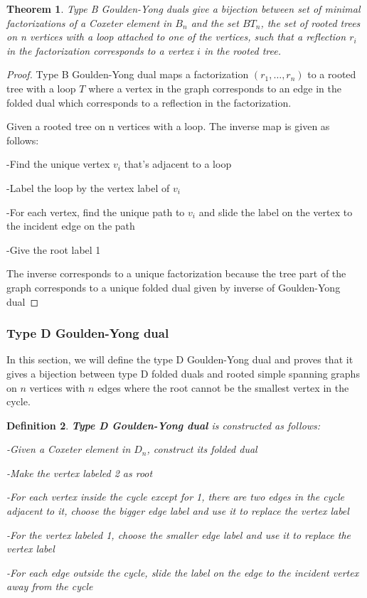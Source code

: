 \documentclass[11pt]{amsart}
\newtheorem{thm}{Theorem}[section]
\newtheorem{defi}[thm]{Definition}%
\begin{document}
\begin{thm}\label{thm D}
    Type B Goulden-Yong duals give a bijection between set of minimal factorizations of a Coxeter element in $B_n$ and the set $BT_n$, the set of rooted trees on n vertices with a loop attached to one of the vertices, such that a reflection $r_i$ in the factorization corresponds to a vertex $i$ in the rooted tree.
\end{thm}

\begin{proof}
    Type B Goulden-Yong dual maps a factorization $(r_1,\dots,r_n)$ to a rooted tree with a loop $T$ where a vertex in the graph corresponds to an edge in the folded dual which corresponds to a reflection in the factorization.

    Given a rooted tree on n vertices with a loop. The inverse map is given as follows:

    -Find the unique vertex $v_i$ that's adjacent to a loop

    -Label the loop by the vertex label of $v_i$

    -For each vertex, find the unique path to $v_i$ and slide the label on the vertex to the incident edge on the path

    -Give the root label 1

    The inverse corresponds to a unique factorization because the tree part of the graph corresponds to a unique folded dual given by inverse of Goulden-Yong dual
\end{proof}

\subsubsection{Type D Goulden-Yong dual}
In this section, we will define the type D Goulden-Yong dual and proves that it gives a bijection between type D folded duals and rooted simple spanning graphs on $n$ vertices with $n$ edges where the root cannot be the smallest vertex in the cycle.
\begin{defi}
    \textbf{Type D Goulden-Yong dual} is constructed as follows:
    
    -Given a Coxeter element in $D_n$, construct its folded dual

    -Make the vertex labeled 2 as root

    -For each vertex inside the cycle except for 1, there are two edges in the cycle adjacent to it, choose the bigger edge label and use it to replace the vertex label

    -For the vertex labeled 1, choose the smaller edge label and use it to replace the vertex label

    -For each edge outside the cycle, slide the label on the edge to the incident vertex away from the cycle
\end{defi}
\end{document}
